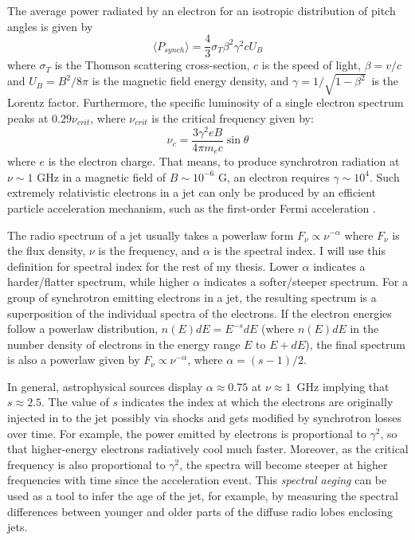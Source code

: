 The average power radiated by an electron for an isotropic distribution of pitch angles is given by 
\begin{equation}\label{eq:synch_pow}
    \langle  P_{synch} \rangle=\frac{4}{3}\sigma_T\beta^2\gamma^2cU_B
\end{equation}
where $\sigma_T$ is the Thomson scattering cross-section, $c$ is the speed of light, $\beta=v/c$ and $U_B=B^2/8\pi$ is the magnetic field energy density, and $\gamma=1/\sqrt{1-\beta^2}$~is the Lorentz factor. Furthermore, 
the specific luminosity of a single electron spectrum peaks at $0.29\nu_{crit}$, where $\nu_{crit}$ is the critical frequency given by:
\begin{equation}
    \nu_c = \frac{3\gamma^2eB}{4\pi m_e c}\sin{\theta}
\end{equation}
where $e$ is the electron charge. That means, to produce synchrotron radiation at $\nu\sim1$ GHz in a magnetic field of $B\sim10^{-6}$ G, an electron  requires $\gamma\sim10^{4}$. Such extremely relativistic electrons in a jet can only be produced by an efficient particle acceleration mechanism, such as the first-order Fermi acceleration \citep{1949PhRv...75.1169F}.

The radio spectrum of a jet usually takes a powerlaw form $F_\nu\propto \nu^{-\alpha}$ where $F_\nu$ is the flux density,  $\nu$ is the frequency, and $\alpha$ is the spectral index. I will use this definition for spectral index for the rest of my thesis. Lower $\alpha$ indicates a harder/flatter spectrum, while higher $\alpha$ indicates a softer/steeper spectrum. For a group of synchrotron emitting electrons in a jet, the resulting spectrum is a superposition of the individual spectra of the electrons. If the electron energies follow a powerlaw distribution, $n(E)dE=E^{-s}dE$ (where $n(E)dE$ in the number density of electrons in the energy range $E \text{~to~} E+dE$), the final spectrum is also a powerlaw given by $F_\nu\propto \nu^{-\alpha}$, where $\alpha=(s-1)/2$.

In general, astrophysical sources display $\alpha\approx0.75$ at $\nu\approx1$~GHz implying that $s\approx2.5$. The value of $s$ indicates the index at which the electrons are originally injected in to the jet possibly via shocks and gets modified by synchrotron losses over time. For example, the power emitted by electrons is proportional to $\gamma^2$, so that higher-energy electrons radiatively cool much faster. Moreover, as the critical frequency is also proportional to $\gamma^2$, the spectra will become steeper at higher frequencies with time since the acceleration event. This \textit{spectral aeging} can be used as a tool to infer the age of the jet, for example, by measuring the spectral differences between younger and older parts of the diffuse radio lobes enclosing jets\citep[e.g.,][]{Harwood_2015}.



